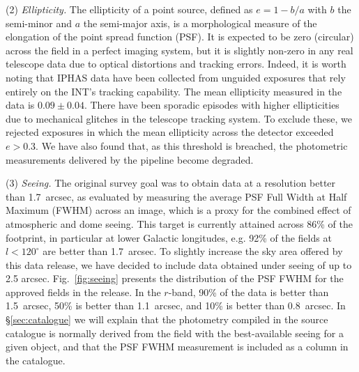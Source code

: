 \documentclass[useAMS,usenatbib]{mn2e}
\begin{document}
(2) \emph{Ellipticity.} 
The ellipticity of a point source,
defined as $e = 1 - b / a$ 
with $b$ the semi-minor and $a$ the semi-major axis,
is a morphological measure of the elongation of the point spread function (PSF).
It is expected to be zero (circular) across the field 
in a perfect imaging system,
but it is slightly non-zero in any real telescope data 
due to optical distortions and tracking errors.
Indeed, it is worth noting
that IPHAS data have been collected
from unguided exposures that rely entirely
on the INT's tracking capability.
The mean ellipticity measured
in the data is $0.09\pm0.04$.
There have been sporadic episodes with higher ellipticities
due to mechanical glitches in the telescope tracking system.
To exclude these, we rejected exposures in which the mean ellipticity
across the detector exceeded $e > 0.3$.
We have also found that, as this threshold is breached,
the photometric measurements delivered by the pipeline become degraded.

(3) \emph{Seeing.} 
The original survey goal was to obtain data 
at a resolution better than 1.7~arcsec,
as evaluated by measuring the average PSF Full Width at Half Maximum (FWHM)
across an image,
which is a proxy for the combined effect of atmospheric and dome seeing.
This target is currently attained across 86\% of the footprint,
in particular at lower Galactic longitudes,
e.g. 92\% of the fields at $l<120^\circ$ are better than 1.7~arcsec.
To slightly increase the sky area offered by this data release,
we have decided to include data obtained under seeing of up to 2.5 arcsec.
Fig.~\ref{fig:seeing} presents the distribution
of the PSF FWHM for the approved fields in the release.
In the $r$-band, 90\% of the data is better than 1.5~arcsec,
50\% is better than 1.1~arcsec,
and 10\% is better than 0.8~arcsec.
In \S\ref{sec:catalogue} we will explain
that the photometry compiled in the source catalogue
is normally derived from the field with the
best-available seeing for a given object,
and that the PSF FWHM measurement
is included as a column in the catalogue.
\end{document}
